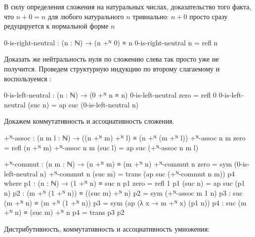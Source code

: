 \documentclass{article}[12pt]
\begin{document}
В силу определения сложения на натуральных числах, доказательство того факта, что $n + 0 = n$ 
для любого натурального $n$ тривиально: $n + 0$ просто сразу редуцируется к нормальной форме $n$
\begin{code}
0-is-right-neutral : (n : ℕ) → (n +ᴺ 0) ≡ n
0-is-right-neutral n = refl n
\end{code}
Доказать же нейтральность нуля по сложению слева так просто уже не получится. Проведем структурную
индукцию по второму слагаемому и воспользуемся :
\begin{code}
0-is-left-neutral : (n : ℕ) → (0 +ᴺ n ≡ n)
0-is-left-neutral zero = refl 0
0-is-left-neutral (suc n) = ap suc (0-is-left-neutral n)
\end{code}

Докажем коммутативность и ассоциативность сложения.
\begin{code}
+ᴺ-assoc : (n m l : ℕ) → ((n +ᴺ m) +ᴺ l) ≡ (n +ᴺ (m +ᴺ l))
+ᴺ-assoc n m zero = refl (n +ᴺ m)
+ᴺ-assoc n m (suc l) = ap suc (+ᴺ-assoc n m l)

+ᴺ-commut : (n m : ℕ) → (n +ᴺ m) ≡ (m +ᴺ n)
+ᴺ-commut n zero = sym (0-is-left-neutral n)
+ᴺ-commut n (suc m) = trans (ap suc (+ᴺ-commut n m)) p4
    where
        p1 : (n : ℕ) → (1 +ᴺ n) ≡ suc n
        p1 zero = refl 1
        p1 (suc n) = ap suc (p1 n)
        p2 : (m +ᴺ (1 +ᴺ n)) ≡ ((suc m) +ᴺ n)
        p2 = sym (+ᴺ-assoc m 1 n)
        p3 : suc (m +ᴺ n) ≡ (m +ᴺ (1 +ᴺ n))
        p3 = sym (ap (λ x → m +ᴺ x) (p1 n))
        p4 : suc (m +ᴺ n) ≡ (suc m) +ᴺ n
        p4 = trans p3 p2
\end{code}
Дистрибутивность, коммутативность и ассоциативность умножения:
\end{document}
